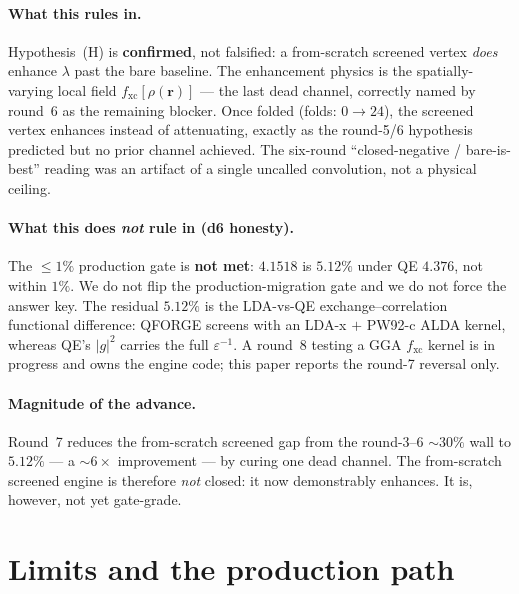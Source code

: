 \documentclass[11pt,a4paper]{article}
\begin{document}
\paragraph{What this rules in.} Hypothesis~(H) is \textbf{confirmed}, not
falsified: a from-scratch screened vertex \emph{does} enhance $\lambda$ past
the bare baseline. The enhancement physics is the spatially-varying local
field $f_{\mathrm{xc}}[\rho(\mathbf{r})]$ --- the last dead channel, correctly
named by round~6 as the remaining blocker. Once folded (folds: $0 \to 24$),
the screened vertex enhances instead of attenuating, exactly as the
round-5/6 hypothesis predicted but no prior channel achieved. The
six-round ``closed-negative / bare-is-best'' reading was an artifact of a
single uncalled convolution, not a physical ceiling.

\paragraph{What this does \emph{not} rule in (d6 honesty).} The $\le\!1\%$
production gate is \textbf{not met}: $4.1518$ is $5.12\%$ under QE $4.376$, not
within $1\%$. We do not flip the production-migration gate and we do not force
the answer key. The residual $5.12\%$ is the LDA-vs-QE exchange--correlation
functional difference: QFORGE screens with an LDA-x $+$ PW92-c ALDA kernel,
whereas QE's $|g|^2$ carries the full $\varepsilon^{-1}$. A round~8 testing a
GGA $f_{\mathrm{xc}}$ kernel is in progress and owns the engine code; this
paper reports the round-7 reversal only.

\paragraph{Magnitude of the advance.} Round~7 reduces the from-scratch
screened gap from the round-3--6 $\sim\!30\%$ wall to $5.12\%$ --- a
$\sim\!6\times$ improvement --- by curing one dead channel. The from-scratch
screened engine is therefore \emph{not} closed: it now demonstrably enhances.
It is, however, not yet gate-grade.

\section{Limits and the production path}
\label{sec:limits}
\end{document}
